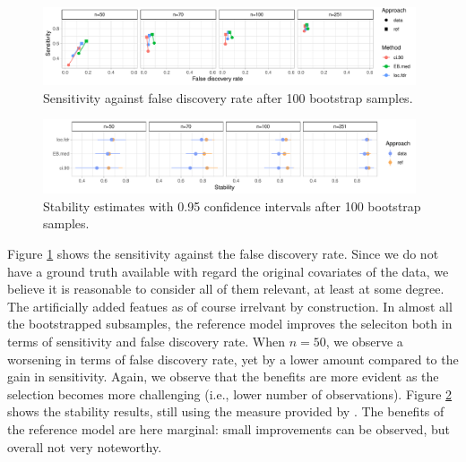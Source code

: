 \documentclass[american,]{article}
\theoremstyle{definition}
\begin{document}

\begin{figure}[tp]
  \centering
  \includegraphics[width=0.98\textwidth]{graphics/bodyfat_sensitivity_vs_fdr.pdf}
  \caption{Sensitivity against false discovery rate after 100 bootstrap samples.\\}
  \label{fig:bodyfat_sensitivity_vs_fdr}
\end{figure}

\begin{figure}[tp]
  \centering
  \includegraphics[width=0.98\textwidth]{graphics/bodyfat_stability.pdf}
  \caption{Stability estimates with 0.95 confidence intervals after 100 bootstrap samples.\\}
  \label{fig:bodyfat_stability}
\end{figure}

Figure \ref{fig:bodyfat_sensitivity_vs_fdr} shows the sensitivity against the false discovery rate. Since we do not have a ground truth available with regard the original covariates of the data, we believe it is reasonable to consider all of them relevant, at least at some degree. The artificially added featues as of course irrelvant by construction. In almost all the bootstrapped subsamples, the reference model improves the seleciton both in terms of sensitivity and false discovery rate. When $n=50$, we observe a worsening in terms of false discovery rate, yet by a lower amount compared to the gain in sensitivity. Again, we observe that the benefits are more evident as the selection becomes more challenging (i.e., lower number of observations). Figure \ref{fig:bodyfat_stability} shows the stability results, still using the measure provided by \cite{paper:stability}. The benefits of the reference model are here marginal: small improvements can be observed, but overall not very noteworthy.
\end{document}
